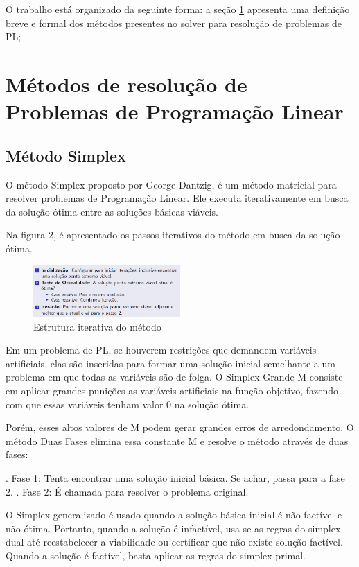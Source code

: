 \documentclass [11pt]{articleSBPO}
\begin{document}
O trabalho está organizado da seguinte forma: a seção \ref{sec:metodos} apresenta uma definição breve e formal dos métodos presentes no solver para resolução de problemas de PL;


\section{Métodos de resolução de Problemas de Programação Linear}
\label{sec:metodos}

\subsection{Método Simplex}

O método Simplex proposto por George Dantzig, é um método matricial para resolver problemas de Programação Linear. Ele executa iterativamente em busca da solução ótima entre as soluções básicas viáveis. 

Na figura 2, é apresentado os passos iterativos do método em busca da solução ótima.

\begin{figure}[!h]
\centering
\includegraphics[width=0.5\textwidth]{img/img1.png}
\caption[]{Estrutura iterativa do método}
\label{fig:figura2}
\end{figure}

Em um problema de PL, se houverem restrições que demandem variáveis artificiais, elas são inseridas para formar uma solução inicial semelhante a um problema em que todas as variáveis são de folga. O Simplex Grande M consiste em aplicar grandes punições as variáveis artificiais na função objetivo, fazendo com que essas variáveis tenham valor 0 na solução ótima.

Porém, esses altos valores de M podem gerar grandes erros de arredondamento. O método Duas Fases elimina essa constante M e resolve o método através de duas fases:

. Fase 1: Tenta encontrar uma solução inicial básica. Se achar, passa para a fase 2.
. Fase 2: É chamada para resolver o problema original.

O Simplex generalizado é usado quando a solução básica inicial é não factível e não ótima. Portanto, quando a solução é infactível, usa-se as regras do simplex dual até reestabelecer a viabilidade ou certificar que não existe solução factível. Quando a solução é factível, basta aplicar as regras do simplex primal.
\end{document}
